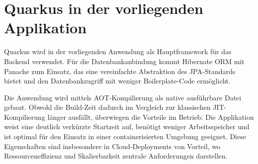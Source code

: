 \section{Quarkus in der vorliegenden Applikation}

Quarkus wird in der vorliegenden Anwendung als Hauptframework für das Backend verwendet. 
Für die Datenbankanbindung kommt Hibernate ORM mit Panache zum Einsatz, das eine 
vereinfachte Abstraktion des JPA-Standards bietet und den Datenbankzugriff mit weniger 
Boilerplate-Code ermöglicht.

Die Anwendung wird mittels AOT-Kompilierung als native ausführbare Datei gebaut. 
Obwohl die Build-Zeit dadurch im Vergleich zur klassischen JIT-Kompilierung länger 
ausfällt, überwiegen die Vorteile im Betrieb: Die Applikation weist eine deutlich 
verkürzte Startzeit auf, benötigt weniger Arbeitsspeicher und ist optimal für den 
Einsatz in einer containerisierten Umgebung geeignet. Diese Eigenschaften sind 
insbesondere in Cloud-Deployments von Vorteil, wo Ressourceneffizienz und 
Skalierbarkeit zentrale Anforderungen darstellen.
